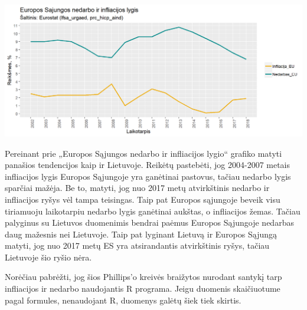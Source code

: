 \documentclass[11pt, titlepage]{article}
\begin{document}
\includegraphics[scale=0.6]{EU_nedarbo_ir_infliacijos_lygis.png}

Pereinant prie „Europos Sąjungos nedarbo ir infliacijos lygio“ grafiko matyti panašios tendencijos kaip ir Lietuvoje. Reikėtų pastebėti, jog 2004-2007 metais infliacijos lygis Europos Sąjungoje yra ganėtinai pastovus, tačiau nedarbo lygis sparčiai mažėja. Be to, matyti, jog nuo 2017 metų atvirkštinis nedarbo ir infliacijos ryšys vėl tampa teisingas. Taip pat Europos sąjungoje beveik visu tiriamuoju laikotarpiu nedarbo lygis ganėtinai aukštas, o infliacijos žemas. Tačiau palyginus su Lietuvos duomenimis bendrai paėmus Europos Sąjungoje nedarbas daug mažesnis nei Lietuvoje. Taip pat lyginant Lietuvą ir Europos Sąjungą matyti, jog nuo 2017 metų ES yra atsirandantis atvirkštinis ryšys, tačiau Lietuvoje šio ryšio nėra.

Norėčiau pabrėžti, jog šios Phillips'o kreivės braižytos nurodant santykį tarp infliacijos ir nedarbo naudojantis R programa. Jeigu duomenis skaičiuotume pagal formules, nenaudojant R, duomenys galėtų šiek tiek skirtis.
\end{document}

